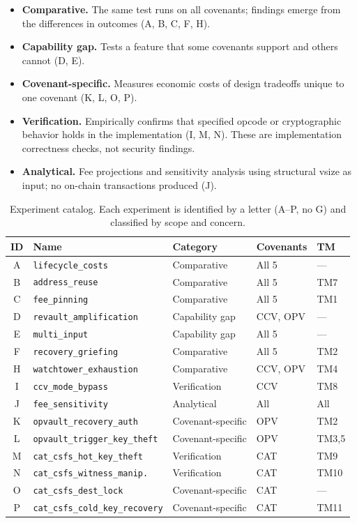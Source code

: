 \begin{itemize}
\item \textbf{Comparative.} The same test runs on all covenants; findings emerge from
  the differences in outcomes (A, B, C, F, H).
\item \textbf{Capability gap.} Tests a feature that some covenants support and others
  cannot (D, E).
\item \textbf{Covenant-specific.} Measures economic costs of design tradeoffs unique
  to one covenant (K, L, O, P).
\item \textbf{Verification.} Empirically confirms that specified opcode or
  cryptographic behavior holds in the implementation (I, M, N). These are
  implementation correctness checks, not security findings.
\item \textbf{Analytical.} Fee projections and sensitivity analysis using structural
  vsize as input; no on-chain transactions produced (J).
\end{itemize}

\begin{table}[t]
\centering
\caption{Experiment catalog. Each experiment is identified by a letter (A--P, no G)
and classified by scope and concern.}
\label{tab:experiment_catalog}
\small
\begin{tabular}{@{}cllll@{}}
\toprule
ID & Name & Category & Covenants & TM \\
\midrule
A & \texttt{lifecycle\_costs}     & Comparative   & All 5  & --- \\
B & \texttt{address\_reuse}       & Comparative   & All 5  & TM7 \\
C & \texttt{fee\_pinning}         & Comparative   & All 5  & TM1 \\
D & \texttt{revault\_amplification} & Capability gap & CCV, OPV & --- \\
E & \texttt{multi\_input}         & Capability gap & All 5  & --- \\
F & \texttt{recovery\_griefing}   & Comparative   & All 5  & TM2 \\
H & \texttt{watchtower\_exhaustion} & Comparative & CCV, OPV & TM4 \\
I & \texttt{ccv\_mode\_bypass}    & Verification  & CCV    & TM8 \\
J & \texttt{fee\_sensitivity}     & Analytical    & All    & All \\
K & \texttt{opvault\_recovery\_auth} & Covenant-specific & OPV & TM2 \\
L & \texttt{opvault\_trigger\_key\_theft} & Covenant-specific & OPV & TM3,5 \\
M & \texttt{cat\_csfs\_hot\_key\_theft} & Verification & CAT & TM9 \\
N & \texttt{cat\_csfs\_witness\_manip.} & Verification & CAT & TM10 \\
O & \texttt{cat\_csfs\_dest\_lock} & Covenant-specific & CAT & --- \\
P & \texttt{cat\_csfs\_cold\_key\_recovery} & Covenant-specific & CAT & TM11 \\
\bottomrule
\end{tabular}
\end{table}

